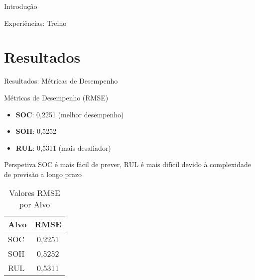 \begin{frame}{Introdução}
\begin{frame}
\begin{frame}{Experiências: Treino}
  \vspace{0.5cm}
  
  \centering
\end{frame}

\section{Resultados}
\begin{frame}{Resultados: Métricas de Desempenho}
  \begin{block}{Métricas de Desempenho (RMSE)}
    \begin{itemize}
      \item \textbf{SOC}: 0,2251 (melhor desempenho)
      \item \textbf{SOH}: 0,5252
      \item \textbf{RUL}: 0,5311 (mais desafiador)
    \end{itemize}
  \end{block}
  
  \begin{exampleblock}{Perspetiva}
    SOC é mais fácil de prever, RUL é mais difícil devido à complexidade de previsão a longo prazo
  \end{exampleblock}
  
  \vspace{0.5cm}
  
  \begin{table}
    \centering
    \caption{Valores RMSE por Alvo}
    \begin{tabular}{lc}
      \toprule
      \textbf{Alvo} & \textbf{RMSE} \\
      \midrule
      SOC & 0,2251 \\
      SOH & 0,5252 \\
      RUL & 0,5311 \\
      \bottomrule
    \end{tabular}
  \end{table}
\end{frame}


\end{frame}
\end{frame}

